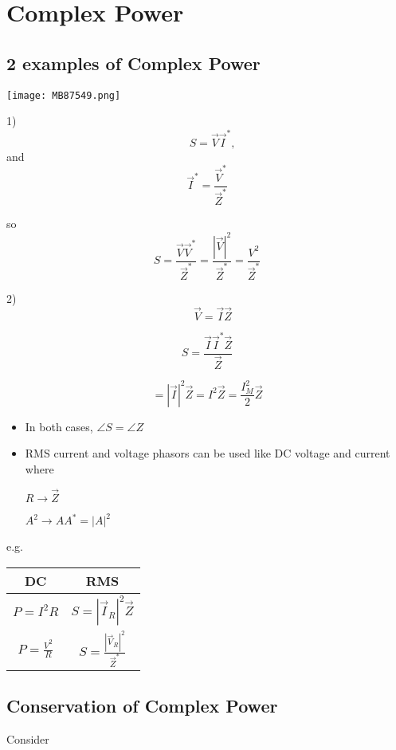 


\section{Complex Power }
\subsection{2 examples of Complex Power}

\texttt{[image: MB87549.png]}


1)
\[
 \quad S = \vec{V} \vec{I}^*,
\]
and
\[ \vec{I}^* = \frac{\vec{V}^*}{\vec{Z}^*}
\]

so
\[
S = \frac{\vec{V} \vec{V}^*}{\vec{Z}^*} = \frac{|\vec{V}|^2}{\vec{Z}^*} = \frac{V^2}{\vec{Z}^*}
\]

2)
\[
 \quad \vec{V} = \vec{I} \vec{Z}
\]

\[
S = \frac{\vec{I} \vec{I}^* \vec{Z}}{\vec{Z}}
\]

\[
= |\vec{I}|^2 \vec{Z} = I^2 \vec{Z} = \frac{I_M^2}{2} \vec{Z}
\]


\begin{itemize}
\item In both cases, $\angle S = \angle Z$

\item RMS current and voltage phasors can be used like DC voltage and current where

$R \rightarrow \vec{Z}$

$A^2 \rightarrow A A^* = |A|^2$
\end{itemize}

e.g.

\begin{center}
\begin{tabular}{c|c}
DC & RMS \\
\hline
$P = I^2 R$ & $S = |\vec{I}_R|^2 \vec{Z}$ \\
$P = \frac{V^2}{R}$ & $S = \frac{|\vec{V}_R|^2}{\vec{Z}^*}$ \\
\end{tabular}
\end{center}

\newpage

\subsection{Conservation of Complex Power}

\noindent Consider


